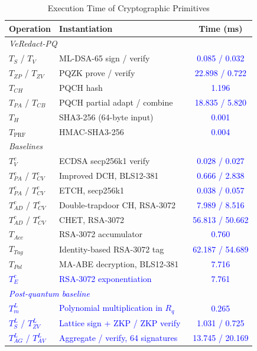 \documentclass[lettersize,journal]{IEEEtran}
\newcommand{\chg}[1]{\textcolor{blue}{#1}}
\begin{document}
    \begin{table}[t]
    \centering
    \caption{Execution Time of Cryptographic Primitives}
    \label{tab:primitives}
    \scriptsize
    \renewcommand{\arraystretch}{1.08}
    \setlength{\tabcolsep}{4pt}
    \begin{tabular}{llc}
    \hline
    \textbf{Operation} & \textbf{Instantiation} & \textbf{Time (ms)} \\
    \hline
    \multicolumn{3}{l}{\textit{VeRedact-PQ}} \\
    $T_S$ / $T_V$ & ML-DSA-65 sign / verify & \chg{0.085 / 0.032} \\
    $T_{ZP}$ / $T_{ZV}$ & PQZK prove / verify & \chg{22.898 / 0.722} \\
    $T_{CH}$ & PQCH hash & \chg{1.196} \\
    $T_{PA}$ / $T_{CB}$ & PQCH partial adapt / combine & \chg{18.835 / 5.820} \\
    $T_H$ & SHA3-256 (64-byte input) & \chg{0.001} \\
    $T_{\mathrm{PRF}}$ & HMAC-SHA3-256 & \chg{0.004} \\
    \hline
    \multicolumn{3}{l}{\textit{Baselines}} \\
    $T_V^{c}$ & ECDSA secp256k1 verify~\cite{ref1,ref27} & \chg{0.028 / 0.027} \\
    $T_{PA}^{c}$ / $T_{CV}^{c}$ & Improved DCH, BLS12-381~\cite{ref1} & \chg{0.666 / 2.838} \\
    $T_{PA}^{c}$ / $T_{CV}^{c}$ & ETCH, secp256k1~\cite{ref27} & \chg{0.038 / 0.057} \\
    $T_{AD}^{c}$ / $T_{CV}^{c}$ & Double-trapdoor CH, RSA-3072~\cite{ref13} & \chg{7.989 / 8.516} \\
    $T_{AD}^{c}$ / $T_{CV}^{c}$ & CHET, RSA-3072~\cite{ref34} & \chg{56.813 / 50.662} \\
    $T_{Acc}$ & RSA-3072 accumulator~\cite{ref1,ref13} & \chg{0.760} \\
    $T_{Tag}$ & Identity-based RSA-3072 tag~\cite{ref13} & \chg{62.187 / 54.689} \\
    $T_{Pol}$ & MA-ABE decryption, BLS12-381~\cite{ref34} & \chg{7.716} \\
    \chg{$T_E^{c}$} & \chg{RSA-3072 exponentiation~\cite{ref13}} & \chg{7.761} \\
    \hline
    \multicolumn{3}{l}{\chg{\textit{Post-quantum baseline}}} \\
    \chg{$T_m^{L}$} & \chg{Polynomial multiplication in $R_q$~\cite{ref39}} & \chg{0.265} \\
    \chg{$T_S^{L}$ / $T_{ZV}^{L}$} & \chg{Lattice sign + ZKP / ZKP verify~\cite{ref39}} & \chg{1.031 / 0.725} \\
    \chg{$T_{AG}^{L}$ / $T_{AV}^{L}$} & \chg{Aggregate / verify, 64 signatures~\cite{ref39}} & \chg{13.745 / 20.169} \\
    \hline
    \end{tabular}
    \end{table}
\end{document}
